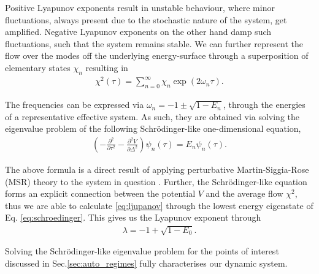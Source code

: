 \documentclass[reprint,amsmath,amssymb,aps]{revtex4-2}
\begin{document}
Positive Lyapunov exponents result in unstable behaviour, where minor fluctuations, always present due to the stochastic nature of the system, get amplified. Negative Lyapunov exponents on the other hand damp such fluctuations, such that the system remains stable. We can further represent the flow over the modes off the underlying energy-surface through a superposition of elementary states $\chi_n$ resulting in
\begin{align*}
    \chi^2(\tau)= \sum_{n=0}^\infty \chi_n \exp\left(2 \omega_n \tau\right).
\end{align*} 

The frequencies can be expressed  via $\omega_n=-1\pm \sqrt{1-E_n}$, through the energies of a representative effective system. As such, they are obtained via solving the eigenvalue problem of the following Schrödinger-like one-dimensional equation,
\begin{align}
\label{eq:schroedinger}
    \left(-\frac{\partial^2}{\partial \tau^2} - \frac{\partial^2 V}{\partial \Delta^2}\right) \psi_n(\tau) = E_n\psi_n(\tau).
\end{align}

The above formula is a direct result of applying perturbative Martin-Siggia-Rose (MSR) theory to the system in question \cite{tauber2014, Sompolinsky1988, Martin1973}. Further, the Schrödinger-like equation forms an explicit connection between the potential $V$ and the average flow $\chi^2$, thus we are able to calculate \eqref{eq:ljupanov} through the lowest energy eigenstate of Eq. \eqref{eq:schroedinger}. This gives us the Lyapunov exponent through
\begin{align}
\label{eq:ljupanov}
    \lambda = -1 + \sqrt{1-E_0}.
\end{align}

Solving the Schrödinger-like eigenvalue problem for the points of interest discussed in Sec.\ref{sec:auto_regimes} fully characterises our dynamic system.

\end{document}
